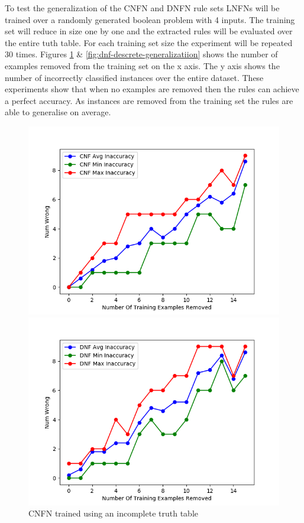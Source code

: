 To test the generalization of the CNFN and DNFN rule sets LNFNs will be trained over a randomly generated boolean problem with 4 inputs. The training set will reduce in size one by one and the extracted rules will be evaluated over the entire tuth table. For each training set size the experiment will be repeated 30 times. Figures \ref{fig:cnf-descrete-generalizatiion} \& \ref{fig:dnf-descrete-generalizatiion} shows the number of examples removed from the training set on the x axis. The y axis shows the number of incorrectly classified instances over the entire dataset. These experiments show that when no examples are removed then the rules can achieve a perfect accuracy. As instances are removed from the training set the rules are able to generalise on average. 

\begin{figure}[H]
	\centering
	\begin{minipage}[b]{0.45\textwidth}
		\includegraphics[width=\textwidth]{cnf-descrete-generalization.png}
		\caption{CNFN trained using an incomplete truth table}
		\label{fig:cnf-descrete-generalizatiion}
	\end{minipage}
	\begin{minipage}[b]{0.45\textwidth}
		\includegraphics[width=\textwidth]{dnf-descrete-generalization.png}

\end{minipage}
\end{figure}
